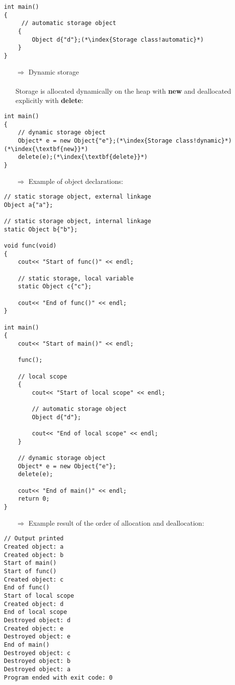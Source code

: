 \documentclass[10pt]{article}
\begin{document}
\begin{lstlisting}
int main()
{
     // automatic storage object
    {
        Object d{"d"};(*\index{Storage class!automatic}*)
    }   
}
\end{lstlisting}
\begin{enumerate}
\item[$\Rightarrow$] Dynamic storage\\ \\ Storage is allocated dynamically on the heap with \textbf{new} and deallocated explicitly with \textbf{delete}:
\end{enumerate}
\begin{lstlisting}
int main()
{
    // dynamic storage object
    Object* e = new Object{"e"};(*\index{Storage class!dynamic}*)(*\index{\textbf{new}}*)
    delete(e);(*\index{\textbf{delete}}*)
}
\end{lstlisting}
\begin{enumerate}
\item[$\Rightarrow$] Example of object declarations:
\end{enumerate}
\begin{lstlisting}
// static storage object, external linkage
Object a{"a"};

// static storage object, internal linkage
static Object b{"b"};

void func(void)
{
    cout<< "Start of func()" << endl;
    
    // static storage, local variable
    static Object c{"c"};
    
    cout<< "End of func()" << endl;
}

int main()
{
    cout<< "Start of main()" << endl;
    
    func();
    
    // local scope
    {
        cout<< "Start of local scope" << endl;
        
        // automatic storage object
        Object d{"d"};
        
        cout<< "End of local scope" << endl;
    }
    
    // dynamic storage object
    Object* e = new Object{"e"};
    delete(e);
    
    cout<< "End of main()" << endl;
    return 0;
}
\end{lstlisting}
\begin{enumerate}
\item[$\Rightarrow$] Example result of the order of allocation and deallocation:
\end{enumerate}
\begin{lstlisting}
// Output printed
Created object: a
Created object: b
Start of main()
Start of func()
Created object: c
End of func()
Start of local scope
Created object: d
End of local scope
Destroyed object: d
Created object: e
Destroyed object: e
End of main()
Destroyed object: c
Destroyed object: b
Destroyed object: a
Program ended with exit code: 0
\end{lstlisting}
%
%
\end{document}
